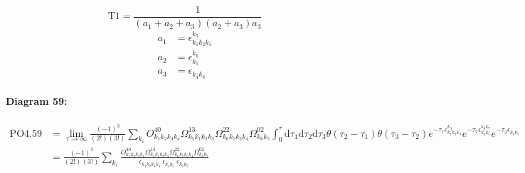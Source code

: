 \documentclass[10pt,a4paper]{article}
\begin{document}
\begin{equation}
\text{T}1 = \frac{1}{(a_1+ a_2+ a_3)(a_2+ a_3)a_3}\end{equation}
\begin{align*}
a_1 &= \epsilon^{k_{5}}_{k_{1}k_{2}k_{3}}\\
a_2 &= \epsilon^{k_{6}}_{k_{5}}\\
a_3 &= \epsilon^{}_{k_{4}k_{6}}
\end{align*}
\paragraph{Diagram 59:}
\begin{align}
\text{PO}4.59
&= \lim\limits_{\tau \to \infty}\frac{(-1)^3 }{(2!)(3!)}\sum_{k_i}O^{40}_{k_{1}k_{2}k_{3}k_{4}} \Omega^{13}_{k_{5}k_{1}k_{2}k_{3}} \Omega^{22}_{k_{6}k_{7}k_{5}k_{4}} \Omega^{02}_{k_{6}k_{7}} \int_{0}^{\tau}\mathrm{d}\tau_1\mathrm{d}\tau_2\mathrm{d}\tau_3\theta(\tau_2-\tau_1) \theta(\tau_3-\tau_2) e^{-\tau_1 \epsilon^{k_{5}}_{k_{1}k_{2}k_{3}}}e^{-\tau_2 \epsilon^{k_{6}k_{7}}_{k_{4}k_{5}}}e^{-\tau_3 \epsilon^{}_{k_{6}k_{7}}}
 \nonumber \\
&= \frac{(-1)^3 }{(2!)(3!)}\sum_{k_i}\frac{O^{40}_{k_{1}k_{2}k_{3}k_{4}} \Omega^{13}_{k_{5}k_{1}k_{2}k_{3}} \Omega^{22}_{k_{6}k_{7}k_{5}k_{4}} \Omega^{02}_{k_{6}k_{7}} }{\epsilon^{}_{k_{1}k_{2}k_{3}k_{4}}\ \epsilon^{}_{k_{4}k_{5}}\ \epsilon^{}_{k_{6}k_{7}}\ } 
\end{align}
\end{document}
